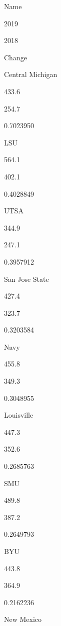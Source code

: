 \documentclass[
]{book}
\newenvironment{Shaded}{\begin{snugshade}}{\end{snugshade}}
\newcommand{\DataTypeTok}[1]{\textcolor[rgb]{0.13,0.29,0.53}{#1}}
\newcommand{\DecValTok}[1]{\textcolor[rgb]{0.00,0.00,0.81}{#1}}
\newcommand{\KeywordTok}[1]{\textcolor[rgb]{0.13,0.29,0.53}{\textbf{#1}}}
\newcommand{\NormalTok}[1]{#1}
\newcommand{\OperatorTok}[1]{\textcolor[rgb]{0.81,0.36,0.00}{\textbf{#1}}}
\newcommand{\StringTok}[1]{\textcolor[rgb]{0.31,0.60,0.02}{#1}}
\begin{document}
\begin{Shaded}
\end{Shaded}

Name

2019

2018

Change

Central Michigan

433.6

254.7

0.7023950

LSU

564.1

402.1

0.4028849

UTSA

344.9

247.1

0.3957912

San Jose State

427.4

323.7

0.3203584

Navy

455.8

349.3

0.3048955

Louisville

447.3

352.6

0.2685763

SMU

489.8

387.2

0.2649793

BYU

443.8

364.9

0.2162236

New Mexico
\end{document}
